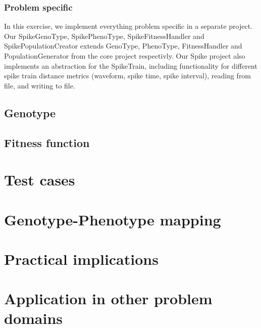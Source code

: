 \documentclass[12pt]{article}
\begin{document}
		\subsubsection{Problem specific}\label{sec:specific}
				In this exercise, we implement everything problem specific in a separate project. Our SpikeGenoType, SpikePhenoType, SpikeFitnessHandler and SpikePopulationCreator extends GenoType, PhenoType, FitnessHandler and PopulationGenerator from the core project respectivly.
		Our Spike project also implements an abstraction for the SpikeTrain, including functionality for different spike train distance metrics (waveform, spike time, spike interval), reading from file, and writing to file.
	\subsection{Genotype}\label{sec:geno}
	\subsection{Fitness function}\label{sec:fitness}

\section{Test cases}\label{sec:test}
\section{Genotype-Phenotype mapping}\label{sec:mapping}
\section{Practical implications}\label{sec:implications}
\section{Application in other problem domains}\label{sec:applications}
\end{document}
